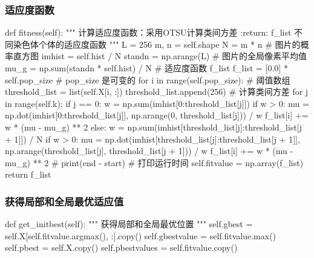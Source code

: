 \documentclass{article}
\begin{document}
\subsubsection{适应度函数}
\begin{python}
    def fitness(self):
        """
        计算适应度函数：采用OTSU计算类间方差
        :return: f_list 不同染色体个体的适应度函数
        """
        L = 256
        m, n = self.shape
        N = m * n
        # 图片的概率直方图
        imhist = self.hist / N
        standn = np.arange(L)
        # 图片的全局像素平均值
        mu_g = np.sum(standn * self.hist) / N
        # 适应度函数 f_list
        f_list = [0.0] * self.pop_size  # pop_size 是可变的
        for i in range(self.pop_size):
            # 阈值数组
            threshold_list = list(self.X[i, :])
            threshold_list.append(256)
            # 计算类间方差
            for j in range(self.k):
                if j == 0:
                    w = np.sum(imhist[0:threshold_list[j]])
                    if w > 0:
                        mu = np.dot(imhist[0:threshold_list[j]], np.arange(0, threshold_list[j])) / w
                        f_list[i] += w * (mu - mu_g) ** 2
                else:
                    w = np.sum(imhist[threshold_list[j]:threshold_list[j + 1]]) / N
                    if w > 0:
                        mu = np.dot(imhist[threshold_list[j]:threshold_list[j + 1]],
                                    np.arange(threshold_list[j], threshold_list[j + 1])) / w
                        f_list[i] += w * (mu - mu_g) ** 2
        # print(end - start)  # 打印运行时间
        self.fitvalue = np.array(f_list)
        return f_list
\end{python}

\subsubsection{获得局部和全局最优适应值}
\begin{python}
    def get_initbest(self):
        """
        获得局部和全局最优位置
        """
        self.gbest = self.X[self.fitvalue.argmax(), :].copy()
        self.gbestvalue = self.fitvalue.max()
        self.pbest = self.X.copy()
        self.pbestvalues = self.fitvalue.copy()
\end{python}
\end{document}
